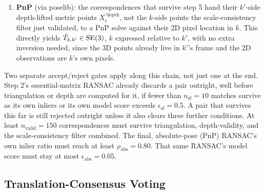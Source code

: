 \begin{enumerate}
    comparing it directly against the depth-lifted point gives a residual
    $r_i = \| X_i^{\mathrm{depth}} - \hat{s}_i X_i^{\mathrm{tri}} \|$, in metres. The
    correspondence $i$ is kept only if $r_i$ clears the scale-consistency floor $\tau_{\mathrm{scale}}$
    (production value $0.2$m). Intuitively, a genuinely correct correspondence's triangulated
    and depth-lifted positions should point in the same direction and differ by one consistent
    scale across all three axes. If they do, a single per-point scale factor explains the
    difference well and the residual is small. A bad triangulation or a mismatched
    correspondence instead tends to disagree with itself internally, its own per-axis ratios
    do not agree on one consistent scale, so forcing a single mean scale factor onto it and
    comparing back leaves a large residual. What the filter actually catches is internal
    inconsistency within one correspondence, not disagreement between different
    correspondences.
  \item \textbf{PnP} (via poselib): the correspondences that survive step 5 hand their $k'$-side
    depth-lifted metric points $X_i^{\prime\mathrm{depth}}$, not the $k$-side points the
    scale-consistency filter just validated, to a PnP solve against their 2D pixel location in
    $k$. This directly yields $\hat{T}_{k,k'} \in \mathrm{SE}(3)$, $k$ expressed relative to $k'$, with
    no extra inversion needed, since the 3D points already live in $k'$'s frame and the 2D
    observations are $k$'s own pixels.
\end{enumerate}
Two separate accept/reject gates apply along this chain, not just one at the end. Step 2's
essential-matrix RANSAC already discards a pair outright, well before triangulation or depth are
computed for it, if fewer than $n_{\mathrm{sf}} = 10$ matches survive as its own inliers or its
own model score exceeds $\epsilon_{\mathrm{sf}} = 0.5$. A pair that survives this far is still
rejected outright unless it also clears three further conditions. At least $n_{\mathrm{valid}} =
150$ correspondences must survive triangulation, depth-validity, and the scale-consistency filter
combined. The final, absolute-pose (PnP) RANSAC's own inlier ratio must reach at least
$\rho_{\mathrm{abs}} = 0.80$. That same RANSAC's model score must stay at most
$\epsilon_{\mathrm{abs}} = 0.05$.

\subsection{Translation-Consensus Voting}

